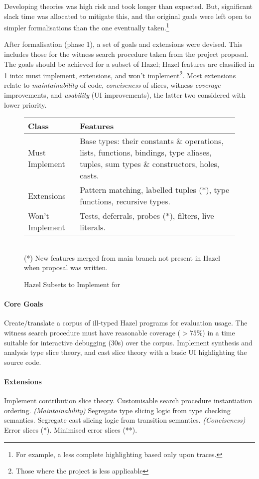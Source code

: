 Developing theories was high risk and took longer than expected. But, significant slack time was allocated to mitigate this, and the original goals were left open to simpler formalisations than the one eventually taken.\footnote{For example, a less complete highlighting based only upon traces.}

After formalisation (phase 1), a set of goals and extensions were devised. This includes those for the witness search procedure taken from the project proposal. The goals should be achieved for a subset of Hazel; Hazel features are classified in \cref{fig:Classes} into: must implement, extensions, and won't implement\footnote{Those where the project is less applicable}. Most extensions relate to \textit{maintainability} of code, \textit{conciseness} of slices, witness \textit{coverage} improvements, and \textit{usability} (UI improvements), the latter two considered with lower priority.

\begin{figure}[h]
\begin{tabular}{lp{12cm}}
Class & Features\\
\hline
{\color{red}Must Implement} & {Base types: their constants \& operations, lists, functions, bindings, type aliases, tuples, sum types \& constructors, holes, casts.}\\
{\color{orange}Extensions} & Pattern matching, labelled tuples (*), type functions, recursive types.\\
{\color{blue}Won't Implement} & Tests, deferrals, probes (*), filters, live literals.\\
\end{tabular}
\ \\

(*) New features merged from main branch not present in Hazel when proposal was written. 
\caption{Hazel Subsets to Implement for}
\label{fig:Classes}
\end{figure}

\paragraph{{\color{red} Core Goals}} Create/translate a corpus of ill-typed Hazel programs for evaluation usage. The witness search procedure must have reasonable coverage ($>75\%$) in a time suitable for interactive debugging (30s) over the corpus. Implement synthesis and analysis type slice theory, and cast slice theory with a basic UI highlighting the source code.

\paragraph{{\color{orange} Extensions}} Implement contribution slice theory. Customisable search procedure instantiation ordering. \textit{(Maintainability)} Segregate type slicing logic from type checking semantics. Segregate cast slicing logic from transition semantics. \textit{(Conciseness)} Error slices (*). Minimised error slices (**). 

